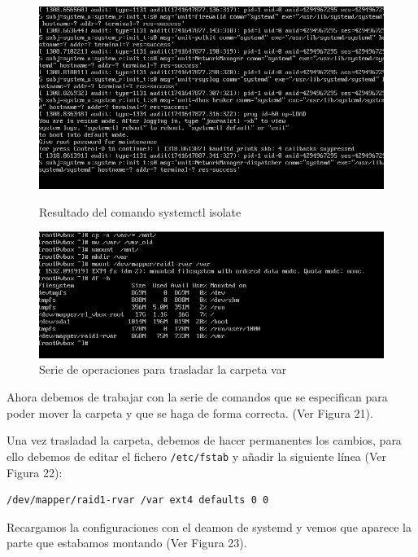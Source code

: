   \begin{figure}[htbp]
    \centering
    \begin{minipage}[b]{0.45\textwidth}
        \centering
        \includegraphics[width=\textwidth]{images/Bloque1/isolate.png}
        \caption{Resultado del comando systemctl isolate}
    \end{minipage}
    \hfill
    \begin{minipage}[b]{0.45\textwidth}
        \centering
        \includegraphics[width=\textwidth]{images/Bloque1/var.png}
        \caption{Serie de operaciones para trasladar la carpeta var}
    \end{minipage}
  \end{figure}

Ahora debemos de trabajar con la serie de comandos que se especifican para poder mover la carpeta y que se haga de forma correcta. (Ver Figura 21).

Una vez trasladad la carpeta, debemos de hacer permanentes los cambios, para ello debemos de editar el fichero \texttt{/etc/fstab} y añadir la siguiente línea (Ver Figura 22):

\begin{lstlisting}[style=mystyle]
  /dev/mapper/raid1-rvar /var ext4 defaults 0 0
\end{lstlisting}

Recargamos la configuraciones con el deamon de systemd y vemos que aparece la parte que estabamos montando (Ver Figura 23).

